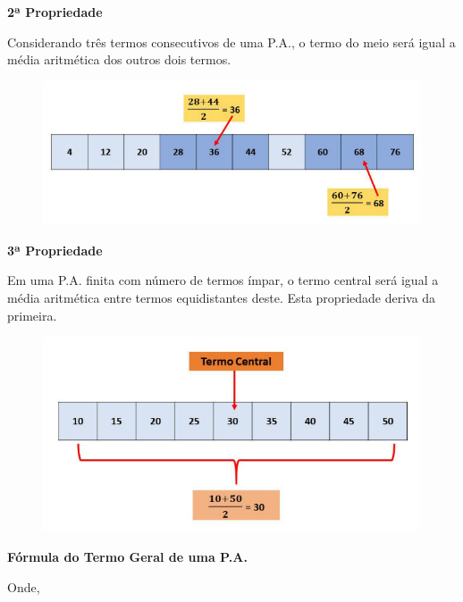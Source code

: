 \begin{multicols*}{2}
	\textbf{2ª Propriedade}

	Considerando três termos consecutivos de uma P.A., o termo do meio será igual a média aritmética dos outros dois termos.

	\begin{figure}[H]
		\centering
		\includegraphics[width=\columnwidth]{assets/papropriedade2.jpg}
	\end{figure}

	\textbf{3ª Propriedade}

	Em uma P.A. finita com número de termos ímpar, o termo central será igual a média aritmética entre termos equidistantes deste. Esta propriedade deriva da primeira.

	\begin{figure}[H]
		\centering
		\includegraphics[width=\columnwidth]{assets/papropriedade3.jpg}
	\end{figure}

	\textbf{Fórmula do Termo Geral de uma P.A.}


	Onde,


\end{multicols*}
